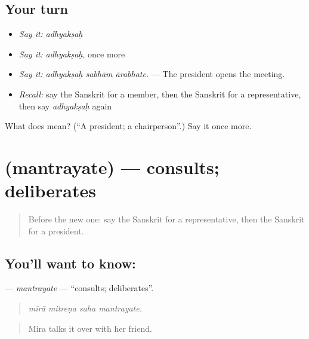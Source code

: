 \subsection*{Your turn}
\begin{itemize}
\raggedright
  \item \emph{Say it:} \emph{adhyakṣaḥ}
  \item \emph{Say it:} \emph{adhyakṣaḥ}, once more
  \item \emph{Say it:} \emph{adhyakṣaḥ sabhām ārabhate.} — The president opens the meeting.
  \item \emph{Recall:} say the Sanskrit for a member, then the Sanskrit for a representative, then say \emph{adhyakṣaḥ} again
\end{itemize}

\begin{tcolorbox}[breakable,colback=teal!4,colframe=teal!35!black,title={Before you move on}]
What does  mean? (\textquotedblleft{}A president; a chairperson\textquotedblright{}.) Say it once more.
\end{tcolorbox}
\section[\texorpdfstring{\sk{मन्त्रयते} (mantrayate)}{मन्त्रयते (mantrayate)}]{ (mantrayate) — consults; deliberates}

\label{lesson:SA-C355-mantrayate}



\begin{quote}
Before the new one: say the Sanskrit for a representative, then the Sanskrit for a president.
\end{quote}

\subsection*{You'll want to know: }
\textbf{} — \emph{mantrayate} — \textquotedblleft{}consults; deliberates\textquotedblright{}.

\begin{quote}
   
\end{quote}

\begin{quote}
\emph{mīrā mitreṇa saha mantrayate.}
\end{quote}

\begin{quote}
Mira talks it over with her friend.
\end{quote}

